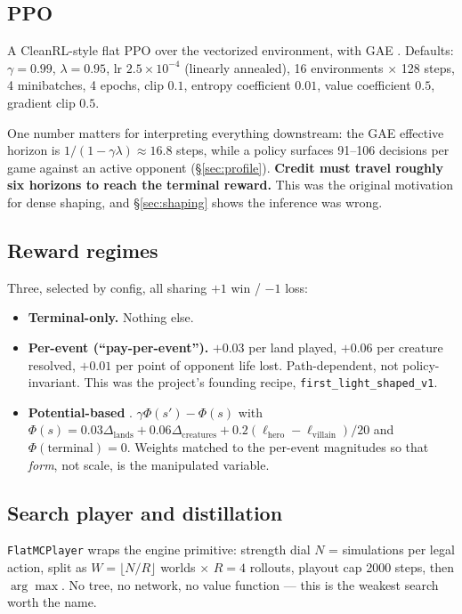 \documentclass[11pt]{article}
\begin{document}
\subsection{PPO}

A CleanRL-style flat PPO \citep{huang2022cleanrl,schulman2017ppo} over the vectorized environment, with GAE \citep{schulman2015gae}. Defaults: $\gamma=0.99$, $\lambda=0.95$, lr $2.5\times10^{-4}$ (linearly annealed), 16 environments $\times$ 128 steps, 4 minibatches, 4 epochs, clip $0.1$, entropy coefficient $0.01$, value coefficient $0.5$, gradient clip $0.5$.

One number matters for interpreting everything downstream: the GAE effective horizon is $1/(1-\gamma\lambda)\approx16.8$ steps, while a policy surfaces 91--106 decisions per game against an active opponent (\S\ref{sec:profile}). \textbf{Credit must travel roughly six horizons to reach the terminal reward.} This was the original motivation for dense shaping, and \S\ref{sec:shaping} shows the inference was wrong.

\subsection{Reward regimes}

Three, selected by config, all sharing $+1$ win / $-1$ loss:
\begin{itemize}\itemsep1pt
\item \textbf{Terminal-only.} Nothing else.
\item \textbf{Per-event (``pay-per-event'').} $+0.03$ per land played, $+0.06$ per creature resolved, $+0.01$ per point of opponent life lost. Path-dependent, not policy-invariant. This was the project's founding recipe, \texttt{first\_light\_shaped\_v1}.
\item \textbf{Potential-based} \citep{ng1999shaping}. $\gamma\Phi(s')-\Phi(s)$ with $\Phi(s)=0.03\Delta_{\text{lands}}+0.06\Delta_{\text{creatures}}+0.2(\ell_{\text{hero}}-\ell_{\text{villain}})/20$ and $\Phi(\text{terminal})=0$. Weights matched to the per-event magnitudes so that \emph{form}, not scale, is the manipulated variable.
\end{itemize}

\subsection{Search player and distillation}

\texttt{FlatMCPlayer} wraps the engine primitive: strength dial $N$ = simulations per legal action, split as $W=\lfloor N/R\rfloor$ worlds $\times$ $R{=}4$ rollouts, playout cap 2000 steps, then $\arg\max$. No tree, no network, no value function --- this is the weakest search worth the name.
\end{document}
